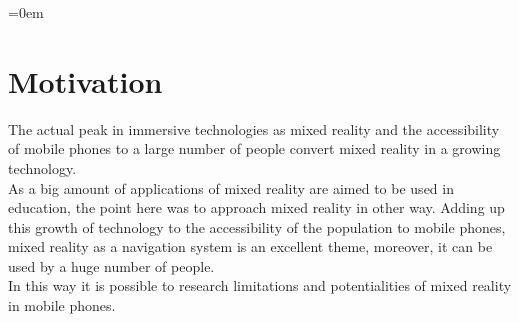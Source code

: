 \parindent=0em
\section{Motivation}
\noindent

The actual peak in immersive technologies as mixed reality and the accessibility of mobile phones to a large number of people convert mixed reality in a growing technology.\\

As a big amount of applications of mixed reality are aimed to be used in education, the point here was to approach mixed reality in other way. Adding up this growth of technology to the accessibility of the population to mobile phones, mixed reality as a navigation system is an excellent theme, moreover, it can be used by a huge number of people.\\

In this way it is possible to research limitations and potentialities of mixed reality in mobile phones.